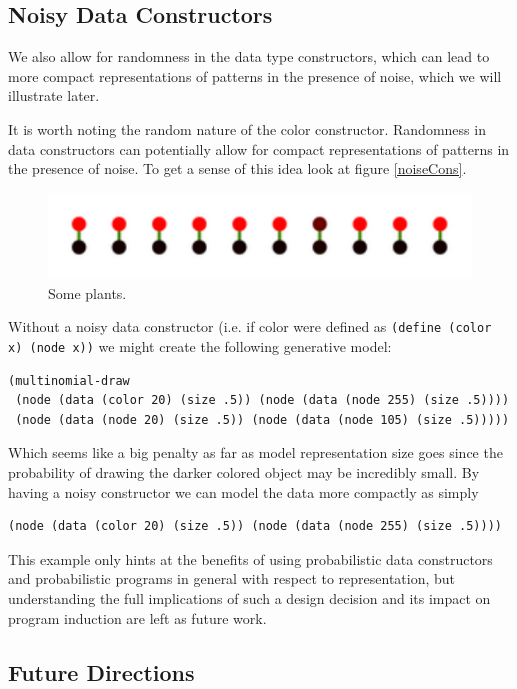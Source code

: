 \documentclass[a4paper,10pt]{article}
\begin{document}
\subsection{Noisy Data Constructors}
We also allow for randomness in the data type constructors, which can lead to more compact representations of patterns in the presence of noise, which we will illustrate later.

It is worth noting the random nature of the color constructor.  Randomness in data constructors can potentially allow for compact representations of patterns in the presence of noise.  To get a sense of this idea look at figure \ref{noiseCons}. 
\begin{figure}[h]
\begin{center}
\includegraphics[scale=.60]{noisyConstructor.pdf}
\end{center}
\label{fig:noiseCons}
\caption{Some plants.}
\end{figure}
Without a noisy data constructor (i.e. if color were defined as \texttt{(define (color x) (node x))} we might create the following generative model:
\begin{verbatim}
(multinomial-draw
 (node (data (color 20) (size .5)) (node (data (node 255) (size .5))))
 (node (data (node 20) (size .5)) (node (data (node 105) (size .5)))))
\end{verbatim}
Which seems like a big penalty as far as model representation size goes since the probability of drawing the darker colored object may be incredibly small.  By having a noisy constructor we can model the data more compactly as simply 
\begin{verbatim}
(node (data (color 20) (size .5)) (node (data (node 255) (size .5))))
\end{verbatim}
This example only hints at the benefits of using probabilistic data constructors and probabilistic programs in general with respect to representation, but understanding the full implications of such a design decision and its impact on program induction are left as future work.

\subsection{Future Directions}
\end{document}
